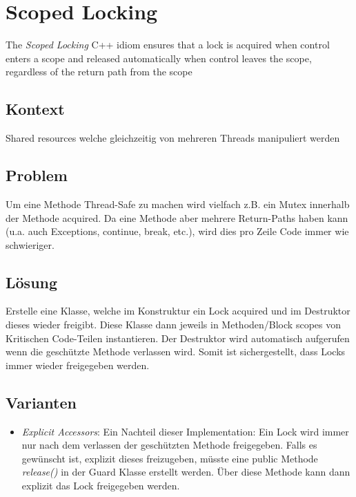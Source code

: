 \section{Scoped Locking}


The \emph{Scoped Locking} C++ idiom ensures that a lock is acquired when control enters a scope and released automatically when control  leaves the scope, regardless of the return path from the scope

\subsection{Kontext}

Shared resources welche gleichzeitig von mehreren Threads manipuliert werden

\subsection{Problem}

Um eine Methode Thread-Safe zu machen wird vielfach z.B. ein Mutex innerhalb der Methode acquired. Da eine Methode aber mehrere Return-Paths haben kann (u.a. auch Exceptions, continue, break,  etc.), wird dies pro Zeile Code immer wie schwieriger.

\subsection{Lösung}

Erstelle eine Klasse, welche im Konstruktur ein Lock acquired und im Destruktor dieses wieder freigibt. Diese Klasse dann jeweils in Methoden/Block scopes von Kritischen Code-Teilen instantieren.
Der Destruktor wird automatisch aufgerufen wenn die geschützte Methode verlassen wird. Somit ist sichergestellt, dass Locks immer wieder freigegeben werden.

\subsection{Varianten}

\begin{itemize}
	\item \emph{Explicit Accessors}: Ein Nachteil dieser Implementation: Ein Lock wird immer nur nach dem verlassen der geschützten Methode freigegeben. Falls es gewünscht ist, explizit dieses freizugeben, müsste eine public Methode \emph{release()} in der Guard Klasse erstellt werden. Über diese Methode kann dann explizit das Lock freigegeben werden.
\end{itemize}

